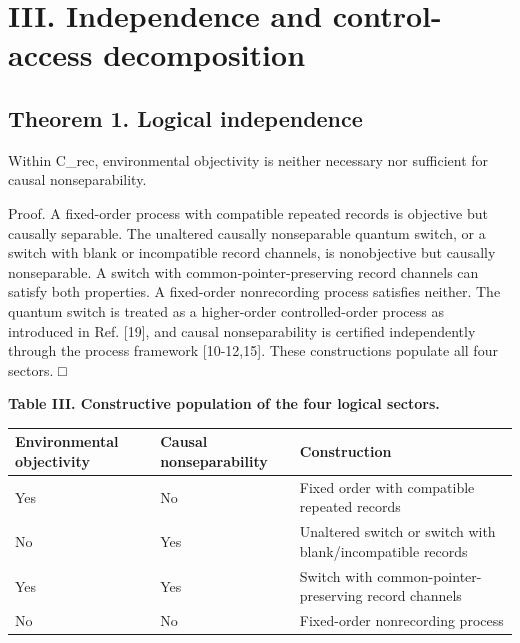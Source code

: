 \documentclass[
]{article}
\begin{document}
\section{III. Independence and control-access
decomposition}\label{iii.-independence-and-control-access-decomposition}

\subsection{Theorem 1. Logical
independence}\label{theorem-1.-logical-independence}

Within C\_rec, environmental objectivity is neither necessary nor
sufficient for causal nonseparability.

Proof. A fixed-order process with compatible repeated records is
objective but causally separable. The unaltered causally nonseparable
quantum switch, or a switch with blank or incompatible record channels,
is nonobjective but causally nonseparable. A switch with
common-pointer-preserving record channels can satisfy both properties. A
fixed-order nonrecording process satisfies neither. The quantum switch
is treated as a higher-order controlled-order process as introduced in
Ref. {[}19{]}, and causal nonseparability is certified independently
through the process framework {[}10-12,15{]}. These constructions
populate all four sectors. □

\textbf{Table III. Constructive population of the four logical sectors.}

\begin{longtable}[]{@{}
  >{\raggedright\arraybackslash}p{}
  >{\raggedright\arraybackslash}p{}
  >{\raggedright\arraybackslash}p{}@{}}
\toprule\noalign{}
\begin{minipage}[b]{\linewidth}\raggedright
\textbf{Environmental objectivity}
\end{minipage} & \begin{minipage}[b]{\linewidth}\raggedright
\textbf{Causal nonseparability}
\end{minipage} & \begin{minipage}[b]{\linewidth}\raggedright
\textbf{Construction}
\end{minipage} \\
\midrule\noalign{}
\endhead
\bottomrule\noalign{}
\endlastfoot
Yes & No & Fixed order with compatible repeated records \\
No & Yes & Unaltered switch or switch with blank/incompatible records \\
Yes & Yes & Switch with common-pointer-preserving record channels \\
No & No & Fixed-order nonrecording process \\
\end{longtable}
\end{document}
